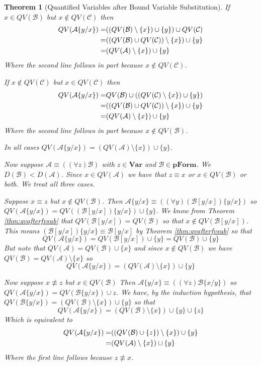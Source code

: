 \documentclass[12pt]{article}
\theoremstyle{break}
\theoremstyle{break}
\newtheorem{theorem}{Theorem}[section]
\theoremstyle{break}
\theoremstyle{break}
\theoremstyle{break}
\newtheorem{informal definition}[definition]{Informal Definition}
\newcommand{\mc}[1]{\mathcal{#1}}
\begin{document}
\begin{theorem}[Quantified Variables after Bound Variable Substitution]
If $x\in QV(\mc{B})$ but $x\not \in QV(\mc{C})$ then
\begin{align}
QV(\mc{A}\{y/x\}) =& ((QV(\mc{B})\setminus\{x\})\cup\{y\})\cup QV(\mc{C}) \notag\\
=& ((QV(\mc{B})\cup QV(\mc{C}))\setminus\{x\})\cup\{y\} \notag\\
=& (QV(\mc{A})\setminus\{x\})\cup\{y\} \notag
\end{align}
Where the second line follows in part because $x\not \in QV(\mc{C})$.

If $x\not \in QV(\mc{C})$ but $x\in QV(\mc{C})$ then
\begin{align}
QV(\mc{A}\{y/x\}) =& QV(\mc{B}) \cup ((QV(\mc{C})\setminus\{x\})\cup\{y\}) \notag\\
=& ((QV(\mc{B})\cup QV(\mc{C}))\setminus\{x\})\cup\{y\} \notag\\
=& (QV(\mc{A})\setminus\{x\})\cup\{y\} \notag
\end{align}
Where the second line follows in part because $x\not \in QV(\mc{B})$.

In all cases $QV(\mc{A}\{y/x\}) = (QV(\mc{A})\setminus\{x\})\cup\{y\}$.

Now suppose $\mc{A}\equiv ((\forall z)\mc{B})$ with $z\in\textbf{Var}$ and $\mc{B}\in\textbf{pForm}$.
We $D(\mc{B}) < D(\mc{A})$.
Since $x\in QV(\mc{A})$ we have that $z\equiv x$ or $x\in QV(\mc{B})$ or both.
We treat all three cases.

Suppose $x\equiv z$ but $x\not \in QV(\mc{B})$.
Then $\mc{A}\{y/x\} \equiv ((\forall y)(\mc{B}[y/x])\{y/x\})$ so $QV(\mc{A}\{y/x\}) = QV((\mc{B}[y/x])\{y/x\})\cup \{y\}$.
We know from Theorem \ref{thm:qvafterfvsub} that $QV(\mc{B}[y/x]) = QV(\mc{B})$ so that $x\not \in QV(\mc{B}[y/x])$.
This means $(\mc{B}[y/x])\{y/x\} \equiv \mc{B}[y/x]$ by Theorem \ref{thm:qvafterfvsub} so that
$$
QV(\mc{A}\{y/x\}) = QV(\mc{B}[y/x])\cup\{y\} = QV(\mc{B})\cup\{y\}
$$
But note that $QV(\mc{A}) = QV(\mc{B})\cup\{x\}$ and since $x\not \in QV(\mc{B})$ we have $QV(\mc{B}) = QV(\mc{A})\setminus\{x\}$ so
$$
QV(\mc{A}\{y/x\}) = (QV(\mc{A})\setminus \{x\})\cup\{y\}
$$

Now suppose $x\not \equiv z$ but $x\in QV(\mc{B})$
Then $\mc{A}\{y/x\} \equiv ((\forall z)\mc{B}\{x/y\})$ so $QV(\mc{A}\{y/x\}) = QV(\mc{B}\{y/x\}) \cup z$.
We have, by the induction hypothesis, that $QV(\mc{B}\{y/x\}) = (QV(\mc{B})\setminus\{x\})\cup\{y\}$ so that
$$
QV(\mc{A}\{y/x\}) = (QV(\mc{B})\setminus\{x\})\cup \{y\} \cup \{z\}
$$
Which is equivalent to
\begin{align}
QV(\mc{A}\{y/x\}) =& ((QV(\mc{B})\cup\{z\})\setminus\{x\})\cup\{y\} \notag \\
=& (QV(\mc{A})\setminus\{x\})\cup\{y\} \notag
\end{align}
Where the first line follows because $z\not \equiv x$.


\end{theorem}
\end{document}
